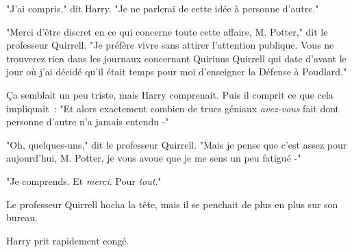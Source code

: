 "J'ai compris," dit Harry. "Je ne parlerai de cette idée à personne d'autre."

"Merci d'être discret en ce qui concerne toute cette affaire, M. Potter," dit le professeur Quirrell. "Je préfère vivre sans attirer l'attention publique. Vous ne trouverez rien dans les journaux concernant Quirinus Quirrell qui date d'avant le jour où j'ai décidé qu'il était temps pour moi d'enseigner la Défense à Poudlard."

Ça semblait un peu triste, mais Harry comprenait. Puis il comprit ce que cela impliquait~: "Et alors exactement combien de trucs géniaux \emph{avez-vous} fait dont personne d'autre n'a jamais entendu -"

"Oh, quelques-uns," dit le professeur Quirrell. "Mais je pense que c'est assez pour aujourd'hui, M. Potter, je vous avoue que je me sens un peu fatigué -"

"Je comprends. Et \emph{merci}. Pour \emph{tout}."

Le professeur Quirrell hocha la tête, mais il se penchait de plus en plus sur son bureau.

Harry prit rapidement congé.~ 

